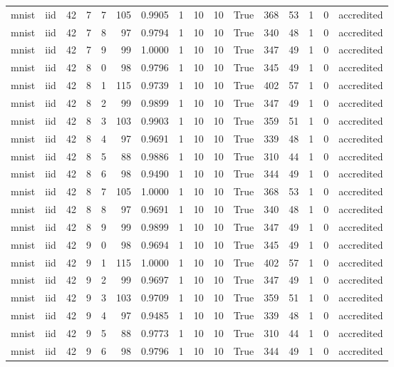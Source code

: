 \begin{tabular}{llrrrrrrrrrrrrrl}
mnist & iid & 42 & 7 & 7 & 105 & 0.9905 & 1 & 10 & 10 & True & 368 & 53 & 1 & 0 & accredited \\
mnist & iid & 42 & 7 & 8 & 97 & 0.9794 & 1 & 10 & 10 & True & 340 & 48 & 1 & 0 & accredited \\
mnist & iid & 42 & 7 & 9 & 99 & 1.0000 & 1 & 10 & 10 & True & 347 & 49 & 1 & 0 & accredited \\
mnist & iid & 42 & 8 & 0 & 98 & 0.9796 & 1 & 10 & 10 & True & 345 & 49 & 1 & 0 & accredited \\
mnist & iid & 42 & 8 & 1 & 115 & 0.9739 & 1 & 10 & 10 & True & 402 & 57 & 1 & 0 & accredited \\
mnist & iid & 42 & 8 & 2 & 99 & 0.9899 & 1 & 10 & 10 & True & 347 & 49 & 1 & 0 & accredited \\
mnist & iid & 42 & 8 & 3 & 103 & 0.9903 & 1 & 10 & 10 & True & 359 & 51 & 1 & 0 & accredited \\
mnist & iid & 42 & 8 & 4 & 97 & 0.9691 & 1 & 10 & 10 & True & 339 & 48 & 1 & 0 & accredited \\
mnist & iid & 42 & 8 & 5 & 88 & 0.9886 & 1 & 10 & 10 & True & 310 & 44 & 1 & 0 & accredited \\
mnist & iid & 42 & 8 & 6 & 98 & 0.9490 & 1 & 10 & 10 & True & 344 & 49 & 1 & 0 & accredited \\
mnist & iid & 42 & 8 & 7 & 105 & 1.0000 & 1 & 10 & 10 & True & 368 & 53 & 1 & 0 & accredited \\
mnist & iid & 42 & 8 & 8 & 97 & 0.9691 & 1 & 10 & 10 & True & 340 & 48 & 1 & 0 & accredited \\
mnist & iid & 42 & 8 & 9 & 99 & 0.9899 & 1 & 10 & 10 & True & 347 & 49 & 1 & 0 & accredited \\
mnist & iid & 42 & 9 & 0 & 98 & 0.9694 & 1 & 10 & 10 & True & 345 & 49 & 1 & 0 & accredited \\
mnist & iid & 42 & 9 & 1 & 115 & 1.0000 & 1 & 10 & 10 & True & 402 & 57 & 1 & 0 & accredited \\
mnist & iid & 42 & 9 & 2 & 99 & 0.9697 & 1 & 10 & 10 & True & 347 & 49 & 1 & 0 & accredited \\
mnist & iid & 42 & 9 & 3 & 103 & 0.9709 & 1 & 10 & 10 & True & 359 & 51 & 1 & 0 & accredited \\
mnist & iid & 42 & 9 & 4 & 97 & 0.9485 & 1 & 10 & 10 & True & 339 & 48 & 1 & 0 & accredited \\
mnist & iid & 42 & 9 & 5 & 88 & 0.9773 & 1 & 10 & 10 & True & 310 & 44 & 1 & 0 & accredited \\
mnist & iid & 42 & 9 & 6 & 98 & 0.9796 & 1 & 10 & 10 & True & 344 & 49 & 1 & 0 & accredited \\

\end{tabular}
